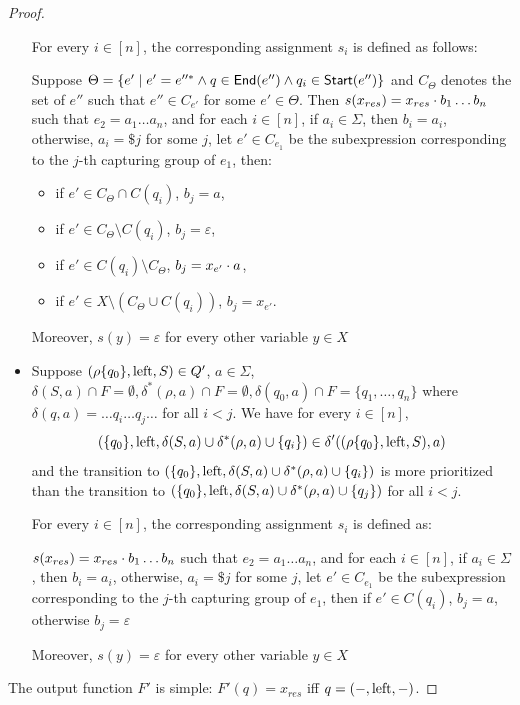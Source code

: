 \begin{proof}
\begin{itemize}
  For every $i \in [n]$, the corresponding assignment $s_i$ is defined as follows:
  
  Suppose $\Theta = \{e' \mid e' = e''^*  \wedge
  q \in {\sf End}(e'') \wedge q_i \in {\sf Start}(e'') \}$ and $C_{\Theta}$ denotes the set of $e''$ such that $e'' \in C_{e'}$ for some $e' \in \Theta$. Then $s (x_{res}) = x_{res}  \cdot b_1   \ldots  b_n$ such that $e_2 = a_1 \ldots a_n$, and for each $i \in [n]$, if $a_i  \in \Sigma$, then $b_i = a_i$, otherwise, $a_i = \$ j$ for some $j$, let $e' \in C_{e_1}$ be the subexpression corresponding to the $j$-th capturing group of $e_1$, then:
  
  \begin{itemize}
\item if $e' \in C_{\Theta} \cap C(q_i)$, $b_j = a$,
%
\item if $e' \in C_{\Theta} \setminus C(q_i)$, $b_j = \varepsilon$, 
%
\item if $e' \in C(q_i) \setminus C_\Theta$, $b_j= x_{e'} \cdot a$,
%
\item if $e' \in X \setminus (C_\Theta \cup C(q_i))$, $b_j = x_{e'}$.
\end{itemize}
  
  Moreover, $s(y) = \varepsilon$ for every other variable $y \in X$
  
  \item Suppose $(\rho \{ q_0 \}, \operatorname{left}, S) \in Q'$, $a \in \Sigma$,
  $\delta (S, a) \cap F = \emptyset, \delta^{\ast} (\rho, a) \cap F = \emptyset,
  \delta (q_0, a) \cap F = \{ q_1, \ldots, q_n \}$ where $\delta (q, a) =
  \ldots q_i \ldots q_j \ldots$ for all $i < j$. We have for every $i \in [n],$
  \[ (\{ q_0 \}, \operatorname{left}, \delta (S, a) \cup \delta^{\ast} (\rho, a) \cup \{ q_i
     \}) \in \delta' ((\rho \{ q_0 \}, \operatorname{left}, S), a) \]
  and the transition to $(\{ q_0 \}, \operatorname{left}, \delta (S, a) \cup \delta^{\ast} (\rho, a) \cup \{
  q_i \})$ is more prioritized than the transition to $(\{ q_0 \}, \operatorname{left}, \delta (S, a)
  \cup \delta^{\ast} (\rho, a) \cup \{ q_j \})$ for all $i < j$.
  
  For every $i \in [n]$, the corresponding assignment $s_i$
  is defined as:
  
  $s (x_{res}) = x_{res}  \cdot b_1   \ldots  b_n$ such that $e_2 = a_1 \ldots a_n$, and for each $i \in [n]$, if $a_i  \in \Sigma$, then $b_i = a_i$, otherwise, $a_i = \$ j$ for some $j$, let $e' \in C_{e_1}$ be the subexpression corresponding to the $j$-th capturing group of $e_1$, then if $e' \in C(q_i)$, $b_j = a$, otherwise $b_j = \varepsilon$

  Moreover, $s(y) = \varepsilon$ for every other variable $y \in X$
  
\end{itemize}
The output function $F'$ is simple: $F' (q) = x_{res}$  iff $q = (-, \operatorname{left}, -) $.
\end{proof}

